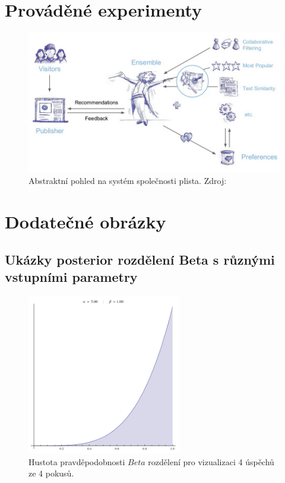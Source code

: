 \documentclass[thesis=M,czech]{FITthesis}[2014/05/07]
\begin{document}
\chapter{Prováděné experimenty}
\begin{figure}\centering
	\includegraphics[width=1.0\textwidth]{obr/plistaEnsemble.png}
 	\caption[Abstraktní pohled na systém společnosti plista]{Abstraktní pohled na systém společnosti plista. Zdroj: \cite{slideshare:plista}}\label{fig:plista}
\end{figure}	


\chapter{Dodatečné obrázky}
\section{Ukázky posterior rozdělení Beta s různými vstupními parametry}

\begin{figure}\centering
	\includegraphics[width=0.6\textwidth]{obr/beta1.png}
 	\caption[Hustota pravděpodobnosti $Beta$ rozdělení pro vizualizaci 4 úspěchů ze 4 pokusů.]{Hustota pravděpodobnosti $Beta$ rozdělení pro vizualizaci 4 úspěchů ze 4 pokusů.}\label{fig:beta1}
\end{figure}	
\end{document}
